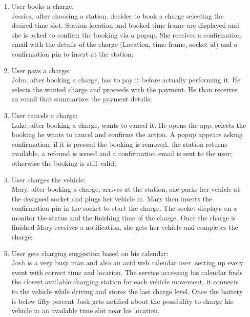 \begin{enumerate}[label=\textbf{S\arabic*}]
      \item User books a charge:\\
            Jessica, after choosing a station, decides to book a charge selecting the desired time slot. Station location and booked time frame are displayed and she is asked to confirm the booking via a popup. She receives a confirmation email with the details
            of the charge (Location, time frame, socket id) and a confirmation pin to insert at the station;\label{SCE:user-books-charge}
      \item User pays a charge:\\
            John, after booking a charge, has to pay it before actually performing it. He selects the wanted charge and proceeds with the payment. He than receives an email that summarizes the payment details;\label{SCE:user-pays-charge}
      \item User cancels a charge:\\
            Luke, after booking a charge, wants to cancel it. He opens the app, selects the booking he wants to cancel and confirms the action. A popup appears asking confirmation: if it is pressed the booking is removed, the station returns available, a refound is issued and a confirmation email is sent to the user; otherwise the booking is still valid;\label{SCE:user-cancels-charge}
      \item User charges the vehicle:\\
            Mary, after booking a charge, arrives at the station, she parks her vehicle at the designed socket
            and plugs her vehicle in. Mary then inserts the confirmation pin in the socket to start the charge.
            The socket displays on a monitor the status and the finishing time of the charge.
            Once the charge is finished Mary receives a notification,
            she gets her vehicle and completes the charge;\label{SCE:user-charges-vehicle}
      \item User gets charging suggestion based on his calendar:\\
            Josh is a very busy man and also an avid web calendar user,
            setting up every event with correct time and location.
            The service accessing his calendar finds the closest available charging station for each vehicle movement,
            it connects to the vehicle while driving and stores the last charge level. Once the battery is below fifty percent Josh gets notified
            about the possibility to charge his vehicle in an available time slot near his location.

\end{enumerate}
